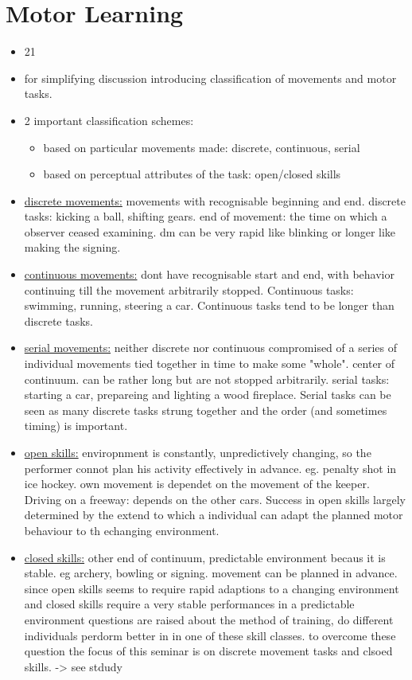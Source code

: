 \section{Motor Learning}
\begin{itemize}
	\item 21
	\item for simplifying discussion introducing classification of movements and motor tasks.
	\item 2 important classification schemes:
	\begin{itemize}
		\item based on particular movements made: discrete, continuous, serial
		\item based on perceptual attributes of the task: open/closed skills
	\end{itemize}
	\item \underline{discrete movements:} movements with recognisable beginning and end. discrete tasks: kicking a ball, shifting gears. end of movement: the time on which a observer ceased examining. dm can be very rapid like blinking or longer like making the signing.
	\item \underline{continuous movements:} dont have recognisable start and end, with behavior continuing till the movement arbitrarily stopped. Continuous tasks: swimming, running, steering a car. Continuous tasks tend to be longer than discrete tasks.
	\item \underline{serial movements:} neither discrete nor continuous compromised of a series of individual movements tied together in time to make some "whole". center of continuum. can be rather long but are not stopped arbitrarily. serial tasks: starting a car, prepareing and lighting a wood fireplace. Serial tasks can be seen as many discrete tasks strung together and the order (and sometimes timing) is important.
	\item \underline{open skills:} enviropnment is constantly, unpredictively changing, so the performer connot plan his activity effectively in advance. eg. penalty shot in ice hockey. own movement is dependet on the movement of the keeper. Driving on a freeway: depends on the other cars. Success in open skills largely determined by the extend to which a individual can adapt the planned motor behaviour  to th echanging environment.
	\item \underline{closed skills:} other end of continuum, predictable environment becaus it is stable. eg archery, bowling or signing. movement can be planned in advance.
	since open skills  seems to require rapid adaptions to a changing environment and closed skills require a very stable performances in a predictable environment questions are raised about the method of training, do different individuals perdorm better in in one of these skill classes. to overcome these question the focus of this seminar is on discrete movement tasks and clsoed skills. -> see stdudy
	
	
\end{itemize}
